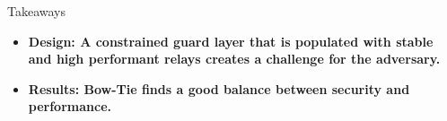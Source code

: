 \documentclass[final]{beamer}
\newlength{\maincolwidth}
\begin{document}
\begin{frame}[t]
\begin{columns}[t]
\begin{column}{\maincolwidth}
    \vspace{1cm}
    \begin{alertblock}{Takeaways}
    \begin{itemize}
    \item \textbf{Design: A constrained guard layer that is populated with stable and high performant relays creates a challenge for the adversary.}
    \vspace{1cm}
    \item \textbf{Results: Bow-Tie finds a good balance between security and performance.}
    \end{itemize}
  \end{alertblock}


\end{column}
\end{columns}
\end{frame}
\end{document}

